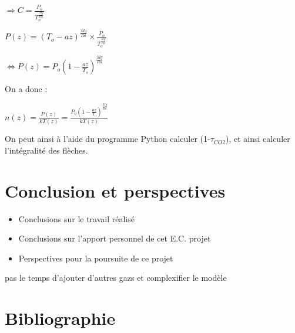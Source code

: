 \documentclass[a4paper, 12pt]{report} %
\begin{document}
\begin{center}
$\Rightarrow C= \frac{P_o}{T_o^{\frac{Mg}{Ra}}}$
\end{center}

\begin{center}
$P(z) = (T_o -az)^{\frac{Mg}{Ra}} \times \frac{P_o}{T_o^{\frac{Mg}{Ra}}}$
\end{center}

\begin{center}
$\Leftrightarrow P(z)= P_o (1-\frac{az}{T_o})^{\frac{Mg}{Ra}}$
\end{center}

On a donc :
\begin{center}
   $n(z)=\frac{P(z)}{kT(z)}= \frac{ P_o (1-\frac{az}{T_o})^{\frac{Mg}{Ra}}}{kT(z)}$
\end{center}

On peut ainsi à l'aide du programme Python calculer (1-$\tau_{CO2}$), et ainsi calculer l'intégralité des flèches.

\chapter*{Conclusion et perspectives}
\begin{itemize}
\item Conclusions sur le travail réalisé
\item Conclusions sur l'apport personnel de cet E.C. projet
\item Perspectives pour la poursuite de ce projet
\end{itemize}

\vspace{\baselineskip}
pas le temps d'ajouter d'autres gazs et complexifier le modèle


\newpage

\renewcommand{\notesname}{} %
\chapter*{Bibliographie}
\makeatletter
\renewcommand{\enoteheading}{\par\vspace{1 em}}
\renewcommand{\theenmark}{\makebox[0.5 em][r]{\@theenmark}}
\renewcommand{\enoteformat}{\parindent = 2 em
  							\leftskip = 0.5 em
  							[\theenmark]\enspace\ignorespaces}							
\makeatother
\theendnotes
\end{document}
